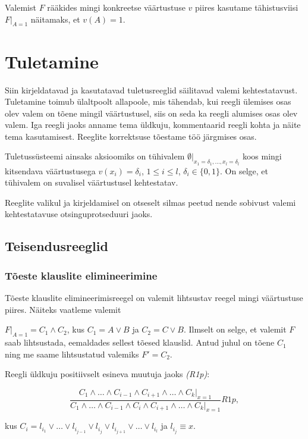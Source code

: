 \documentclass[12pt,estonian]{report}
\begin{document}
Valemist $F$ rääkides mingi konkreetse väärtustuse $v$ piires kasutame
tähistusviisi $F|_{A=1}$ näitamaks, et $v(A)=1$.


\chapter{Tuletamine}

Siin kirjeldatavad ja kasutatavad tuletusreeglid säilitavad valemi
kehtestatavust. Tuletamine toimub ülaltpoolt allapoole, mis tähendab,
kui reegli ülemises osas olev valem on tõene mingil väärtustusel,
siis on seda ka reegli alumises osas olev valem. Iga reegli jaoks
anname tema üldkuju, kommentaarid reegli kohta ja näite tema kasutamisest.
Reeglite korrektsuse tõestame töö järgmises osas.

Tuletussüsteemi ainsaks aksioomiks on tühivalem $\emptyset|_{x_1=\delta_1,...,x_l=\delta_l}$ koos mingi
kitsendava väärtustusega $v(x_i)=\delta_i$, $1\le i\le l$, $\delta_i \in \{0,1\}$. On selge, et tühivalem
on suvalisel väärtustusel kehtestatav.

Reeglite valikul ja kirjeldamisel on otseselt silmas peetud nende sobivust
valemi kehtestatavuse otsinguprotseduuri jaoks.

\section{Teisendusreeglid}


\subsection{Tõeste klauslite elimineerimine}

Tõeste klauslite elimineerimisreegel on valemit lihtsustav reegel
mingi väärtustuse piires. Näiteks vaatleme valemit

$F|_{A=1}=C_{1}\wedge C_{2}$, kus $C_{1}=A\vee B$ ja $C_{2}=C\vee B$.
Ilmselt on selge, et valemit $F$ saab lihtsustada, eemaldades sellest
tõesed klauslid. Antud juhul on tõene $C_{1}$ ning me saame lihtsustatud
valemiks $F'=C_{2}$. 

Reegli üldkuju positiivselt esineva muutuja jaoks \emph{(R1p)}:

\[
\frac{C_{1}\wedge\dots\wedge C_{i-1}\wedge C_{i+1}\wedge\dots\wedge C_{k}|_{x=1}}{C_{1}\wedge\dots\wedge C_{i-1}\wedge C_{i}\wedge C_{i+1}\wedge\dots\wedge C_{k}|_{x=1}}R1p,\]

kus $C_{i}=l_{i_{1}}\vee\dots\vee l_{i_{j-1}}\vee l_{i_{j}}\vee l_{i_{j+1}}\vee\dots\vee l_{i_{l}}$ ja $l_{i_{j}}\equiv x$.
\end{document}
